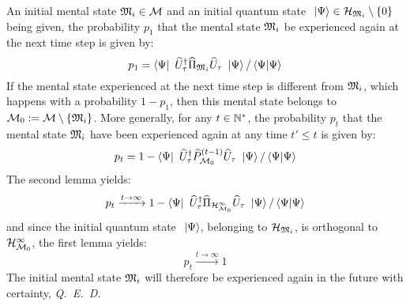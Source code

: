  An initial mental state $\mathfrak{M}_i \in \mathcal M$ and an initial quantum state $\ \left|{\Psi}\right\rangle \in \mathcal H_{\mathfrak{M}_i} \setminus \{0\}$ being given, the probability $p_1$ that the mental state $\mathfrak{M}_i$ be experienced again at the next time step is given by:
\begin{equation*}
p_1 = \left\langle{\Psi}\right|\  \widehat{U}^{\dagger}_\tau \widehat{\Pi}_{\mathfrak{M}_i} \widehat{U}_\tau \ \left|{\Psi}\right\rangle / \left\langle{\Psi}|{\Psi}\right\rangle
\end{equation*}
If the mental state experienced at the next time step is different from $\mathfrak{M}_i$, which happens with a probability $1 - p_1$, then this mental state belongs to $\mathcal M_0 := \mathcal M \setminus \{ \mathfrak{M}_i \}$. More generally, for any $t \in \mathbb{N}^*$, the probability $p_t$ that the mental state $\mathfrak{M}_i$ have been experienced again at any time $t' \leq t$ is given by:
\begin{equation*}
p_t = 1 - \left\langle{\Psi}\right|\  \widehat{U}^{\dagger}_\tau \widehat{P}_{\mathcal M_0}^{(t-1)} \widehat{U}_\tau \ \left|{\Psi}\right\rangle / \left\langle{\Psi}|{\Psi}\right\rangle
\end{equation*}
The second lemma yields:
\begin{equation*}
p_t \xrightarrow{t \to \infty} 1 - \left\langle{\Psi}\right|\  \widehat{U}^{\dagger}_\tau \widehat{\Pi}_{\mathcal H_{\mathcal M_0}^\infty} \widehat{U}_\tau \ \left|{\Psi}\right\rangle / \left\langle{\Psi}|{\Psi}\right\rangle
\end{equation*}
and since the initial quantum state $\ \left|{\Psi}\right\rangle$, belonging to $\mathcal H_{\mathfrak{M}_i}$, is orthogonal to $\mathcal H_{\mathcal M_0}^\infty$, the first lemma yields:
\begin{equation*}
p_t \xrightarrow{t \to \infty} 1
\end{equation*}
The initial mental state $\mathfrak{M}_i$ will therefore be experienced again in the future with certainty,  \textit{Q.~E.~D.}





